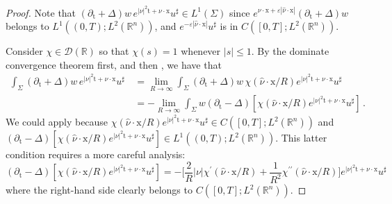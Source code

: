 \documentclass[10pt,a4paper]{amsart}
\theoremstyle{remark}
\theoremstyle{definition}
\newcommand{\R}{\mathbb{R}}
\newcommand{\tm}{\mathrm{t}}
\newcommand{\x}{\mathrm{x}}
\begin{document}
\begin{proof}
Note that $( \partial_{\tm}+\Delta) w \, e^{|\nu|^2 \tm + \nu \cdot \x} u^\sharp \in L^1(\Sigma)$
since $e^{\nu \cdot \x + \varepsilon |\hat \nu \cdot \x|} ( \partial_{\tm}+\Delta) w $ belongs to 
$ L^1((0,T); L^2(\R^n))$, and $ e^{-\varepsilon |\hat \nu \cdot \x|} u^\sharp $ is in 
$C([0, T] ; L^{2}(\mathbb{R}^{n}))$.

Consider $\chi \in \mathcal{D}(\R)$ so that $\chi(s) = 1$ whenever $|s| \leq 1$.
By the dominate convergence theorem first, and then , we have that
\begin{align*}
\int_{\Sigma}( \partial_{\tm}+\Delta) w \, e^{|\nu|^2 \tm + \nu \cdot \x} u^\sharp \, 
&= \lim_{R\to \infty} \int_{\Sigma}( \partial_{\tm}+\Delta) w \, \chi(\hat \nu \cdot \x/R) e^{|\nu|^2 \tm + \nu \cdot \x} u^\sharp \, \\
&= - \lim_{R\to \infty} \int_{\Sigma} w (\partial_{\tm}-\Delta) [\chi(\hat \nu \cdot \x/R) e^{|\nu|^2 \tm + \nu \cdot \x} u^\sharp] \, .
\end{align*}
We could apply  because
$\chi(\hat \nu \cdot \x/R) e^{|\nu|^2 \tm + \nu \cdot \x} u^\sharp \in C([0, T] ; L^{2}(\mathbb{R}^{n}))$ and $(\partial_{\tm}-\Delta) [\chi(\hat \nu \cdot \x/R) e^{|\nu|^2 \tm + \nu \cdot \x} u^\sharp] \in L^{1}((0, T) ; L^{2}(\mathbb{R}^{n}))$. This latter condition requires a more careful
analysis:
\[ (\partial_{\tm}-\Delta) [\chi(\hat \nu \cdot \x/R) e^{|\nu|^2 \tm + \nu \cdot \x} u^\sharp] = - \Big[\frac{2}{R} |\nu| \chi^\prime (\hat \nu \cdot \x/R) + \frac{1}{R^2} \chi^{\prime \prime} (\hat \nu \cdot \x/R) \Big] e^{|\nu|^2 \tm + \nu \cdot \x} u^\sharp \]
where the right-hand side clearly belongs to $C([0, T] ; L^{2}(\mathbb{R}^{n}))$.


\end{proof}
\end{document}
